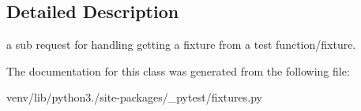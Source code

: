 \subsection{Detailed Description}
\begin{DoxyVerb}a sub request for handling getting a fixture from a
test function/fixture. \end{DoxyVerb}
 

The documentation for this class was generated from the following file\+:\begin{DoxyCompactItemize}
\item 
venv/lib/python3./site-\/packages/\+\_\+pytest/fixtures.\+py\end{DoxyCompactItemize}

